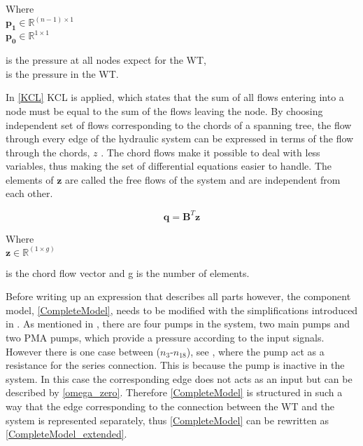 \begin{minipage}[t]{0.24\textwidth}
Where\\
\hspace*{8mm} $\bm{p_1} \in \mathbb{R}^{(n-1) \times 1}$  \\
\hspace*{8mm} $\bm{p_0} \in \mathbb{R}^{1 \times 1} $ 
\end{minipage}
\begin{minipage}[t]{0.68\textwidth}
\vspace*{2mm}
\hspace*{4mm} is the pressure at all nodes expect for the WT,\\
\hspace*{4mm} is the pressure in the WT.
\end{minipage}

In \eqref{KCL} KCL is applied, which states that the sum of all flows entering into a node must be equal to the sum of the flows leaving the node. By choosing independent set of flows corresponding to the chords of a spanning tree, the flow through every edge of the hydraulic system can be expressed in terms of the flow through the chords, $z$ \cite{GraphModel}.
The chord flows make it possible to deal with less variables, thus making the set of differential equations easier to handle.  The elements of $\bm{z}$ are called the free flows of the system and are independent from each other\cite{GraphTheoryCarsten}.

\begin{equation}
  \bm{q} = \bm{B} ^{T}  \bm{z}
  \label{ChordRelation}
\end{equation}

\begin{minipage}[t]{0.20\textwidth}
Where\\
\hspace*{8mm} $\bm{z} \in \mathbb{R}^{(1 \times g)} $ 
\end{minipage}
\begin{minipage}[t]{0.68\textwidth}
\vspace*{2mm}
\hspace*{4mm} is the chord flow vector and g is the number of elements.
\end{minipage}

Before writing up an expression that describes all parts however, the component model, \eqref{CompleteModel}, needs to be modified with the simplifications introduced in . As mentioned in , there are four pumps in the system, two main pumps and two PMA pumps, which provide a pressure according to the input signals. However there is one case between ($n_3$-$n_{18}$), see , where the pump act as a resistance for the series connection. This is because the pump is inactive in the system. In this case the corresponding edge does not acts as an input but can be described by \eqref{omega_zero}. Therefore \eqref{CompleteModel} is structured in such a way that the edge corresponding to the connection between the WT and the system is represented separately, thus \eqref{CompleteModel} can be rewritten as  \eqref{CompleteModel_extended}.

